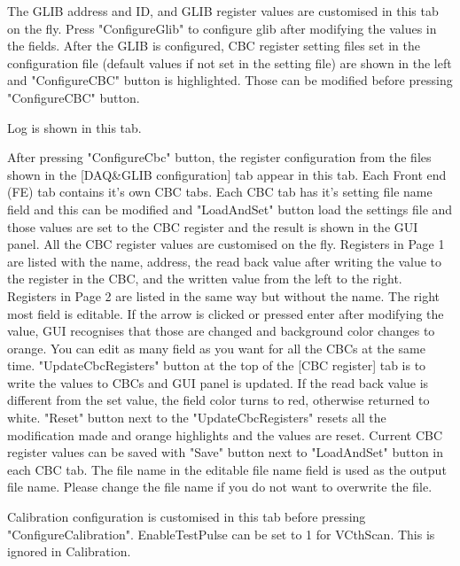 \documentclass[11pt,a4paper]{article}
\begin{document}
	\begin{description}[style=nextline]
	\item[DAQ\&GLIB configuration] 
	The GLIB address and ID, and GLIB register values are customised in this tab on the fly. Press "ConfigureGlib" to configure glib after modifying the values in the fields. After the GLIB is configured, CBC register setting files set in the configuration file (default values if not set in the setting file) are shown in the left and "ConfigureCBC" button is highlighted. Those can be modified before pressing "ConfigureCBC" button. 
	\item[Log]
	Log is shown in this tab.
	\item[CBC register]
	After pressing "ConfigureCbc" button, the register configuration from the files shown in the 
	[DAQ\&GLIB configuration] tab appear in this tab. Each Front end (FE) tab contains it's own CBC tabs. 
	Each CBC tab has it's setting file name field and this can be modified and "LoadAndSet" button load the settings file and those values are set to the CBC register and the result is shown in the GUI panel.
	All the CBC register values are customised on the fly. 
	Registers in Page 1 are listed with the name, address, the read back value after writing the value to the register in the CBC, and the written value from the left to the right.  
	Registers in Page 2 are listed in the same way but without the name. The right most field is editable.  
	If the arrow is clicked or pressed enter after modifying the value, GUI recognises that those are changed and background color changes to orange.  
	You can edit as many field as you want for all the CBCs at the same time. 
	"UpdateCbcRegisters" button at the top of the [CBC register] tab is to write the values to CBCs and GUI panel is updated.
	If the read back value is different from the set value, the field color turns to red, otherwise returned to white.
	"Reset" button next to the "UpdateCbcRegisters"  resets all the modification made and orange highlights and the values are reset.
	Current CBC register values can be saved with "Save" button next to "LoadAndSet" button in each CBC tab.  
	The file name in the editable file name field is used as the output file name. Please change the file name if you do not want to overwrite the file.

	\item[Calibration configuration]
	Calibration configuration is customised in this tab before pressing "ConfigureCalibration".  
	EnableTestPulse can be set to 1 for VCthScan. This is ignored in Calibration.


\end{description}
\end{document}
